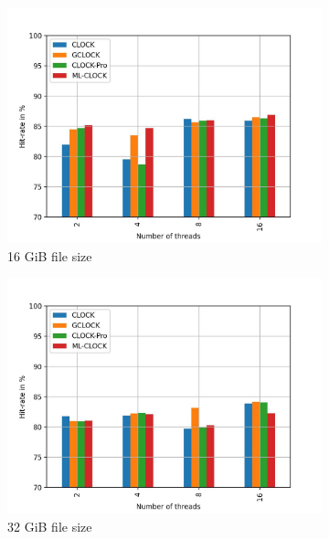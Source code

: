 \documentclass[
	12pt,
	a4paper,
	abstract,
	bibliography=totoc,
	chapterprefix,
	headings=openright,
	numbers=endperiod,
	parskip=half,
	twoside,
]{scrreprt}
\begin{document}
\begin{figure}[H]
	\centering
	\begin{subfigure}{0.4\textwidth}
		\includegraphics[width=\textwidth]{multi_16_gb_rw_50to50_normal.jpg}		
		\caption{16 GiB file size}
		\label{fig:rw_50to50 16 normal}
	\end{subfigure}
	\hfill
	\begin{subfigure}{0.4\textwidth}
		\includegraphics[width=\textwidth]{multi_32_gb_rw_50to50_normal.jpg}		
		\caption{32 GiB file size}
		\label{fig:rw_50to50 32 normal}
	\end{subfigure}
	\hfill
	\begin{subfigure}{0.4\textwidth}

\end{subfigure}
\end{figure}
\end{document}
